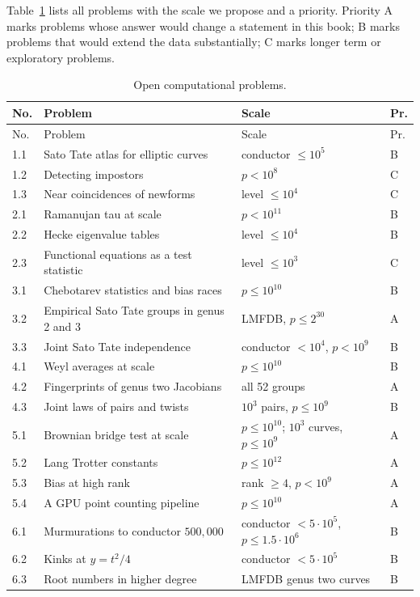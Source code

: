 Table~\ref{tab:14all} lists all problems with the scale we propose and a priority. Priority A marks problems whose answer would change a statement in this book; B marks problems that would extend the data substantially; C marks longer term or exploratory problems.

{\small
\begin{longtable}{p{0.9cm}p{5.3cm}p{3.0cm}p{0.5cm}}
\caption{Open computational problems.}\label{tab:14all}\\
\toprule
No. & Problem & Scale & Pr.\\
\midrule
\endfirsthead
\toprule
No. & Problem & Scale & Pr.\\
\midrule
\endhead
1.1 & Sato Tate atlas for elliptic curves & conductor $\le 10^5$ & B\\
1.2 & Detecting impostors & $p<10^8$ & C\\
1.3 & Near coincidences of newforms & level $\le 10^4$ & C\\
2.1 & Ramanujan tau at scale & $p<10^{11}$ & B\\
2.2 & Hecke eigenvalue tables & level $\le 10^4$ & B\\
2.3 & Functional equations as a test statistic & level $\le 10^3$ & C\\
3.1 & Chebotarev statistics and bias races & $p \le 10^{10}$ & B\\
3.2 & Empirical Sato Tate groups in genus 2 and 3 & LMFDB, $p\le2^{30}$ & A\\
3.3 & Joint Sato Tate independence & conductor $<10^4$, \mbox{$p<10^9$} & B\\
4.1 & Weyl averages at scale & $p \le 10^{10}$ & B\\
4.2 & Fingerprints of genus two Jacobians & all 52 groups & A\\
4.3 & Joint laws of pairs and twists & $10^3$ pairs, $p\le 10^9$ & B\\
5.1 & Brownian bridge test at scale & $p\le 10^{10}$; $10^3$ curves, $p\le 10^9$ & A\\
5.2 & Lang Trotter constants & $p \le 10^{12}$ & A\\
5.3 & Bias at high rank & rank $\ge 4$, $p<10^9$ & A\\
5.4 & A GPU point counting pipeline & $p\le10^{10}$ & A\\
6.1 & Murmurations to conductor $500{,}000$ & conductor $<5\cdot10^5$, $p\le1.5\cdot10^6$ & B\\
6.2 & Kinks at $y=t^2/4$ & conductor $<5\cdot10^5$ & B\\
6.3 & Root numbers in higher degree & LMFDB genus two curves & B\\

\end{longtable}}
